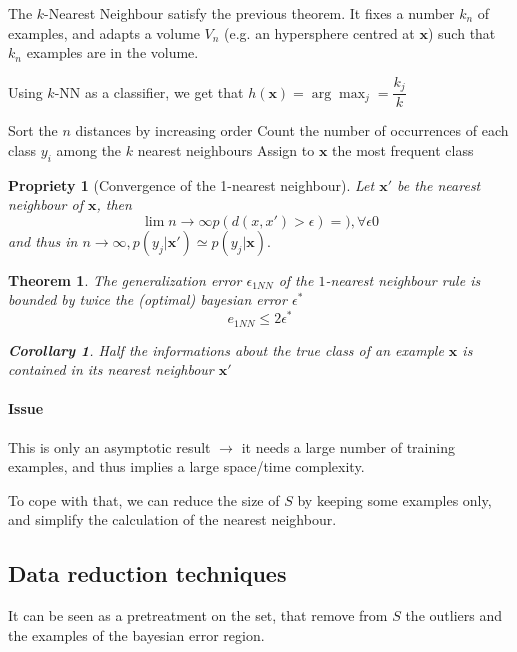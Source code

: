 \documentclass{article}
\newtheorem{thm}{Theorem}
\newtheorem{prop}{Propriety}
\newtheorem{coro}{Corollary}
\begin{document}
The $k$-Nearest Neighbour satisfy the previous theorem. It fixes a number $k_n$ of examples, and adapts a volume $V_n$ (e.g. an hypersphere centred at $\mathbf{x}$) such that $k_n$ examples are in the volume.
\bigskip

Using $k$-NN as a classifier, we get that $h(\mathbf{x})= \arg \max_{j} = \dfrac{k_j}{k}$

\begin{algorithm}
Sort the $n$ distances by increasing order\;
Count the number of occurrences of each class $y_i$ among the $k$ nearest neighbours\;
Assign to $\mathbf{x}$ the most frequent class \;
\end{algorithm}

\begin{prop}[Convergence of the 1-nearest neighbour]
Let $\mathbf{x}'$ be the nearest neighbour of $\mathbf{x}$, then 
\[\lim n\to \infty p(d(x,x') > \epsilon) = ), \forall \epsilon 0\]
and thus in $n \to \infty, p(y_j|\mathbf{x}')\simeq p(y_j | \mathbf{x}).$
\end{prop}

\begin{thm}
The generalization error $\epsilon_{1NN}$ of the $1$-nearest neighbour rule is bounded by twice the (optimal) bayesian error $\epsilon^*$
\[e_{1NN}\leq 2\epsilon^*\]
\begin{coro}
Half the informations about the true class of an example $\mathbf{x}$ is contained in its nearest neighbour $\mathbf{x}'$
\end{coro}
\end{thm}

\paragraph{Issue}
This is only an asymptotic result $\to$ it needs a large number of training examples, and thus implies a large space/time complexity.

To cope with that, we can reduce the size of $S$ by keeping some examples only, and simplify the calculation of the nearest neighbour.


\subsection{Data reduction techniques}
It can be seen as a pretreatment on the set, that remove from $S$ the outliers and the examples of the bayesian error region.
\end{document}
